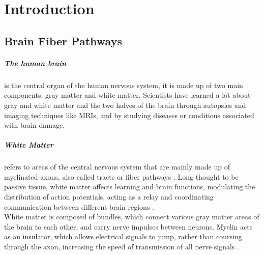 \documentclass[../structure.tex]{subfiles}
\begin{document}
\chapter{Introduction}
	\section{Brain Fiber Pathways}
	\paragraph{The human brain} is the central organ of the human nervous system, it is made up of two main components, gray matter and white matter. Scientists have learned a lot about gray and white matter and the two halves of the brain through autopsies and imaging techniques like MRIs, and by studying diseases or conditions associated with brain damage.
	\paragraph{White Matter}refers to areas of the central nervous system that are mainly made up of myelinated axons, also called tracts or fiber pathways \cite{Blumenfeld2010}. Long thought to be passive tissue, white matter affects learning and brain functions, modulating the distribution of action potentials, acting as a relay and coordinating communication between different brain regions \cite{Fields2008}.\\
White matter is composed of bundles, which connect various gray matter areas %
 of the brain to each other, and carry nerve impulses between neurons. Myelin acts as an insulator, which allows electrical signals to jump, rather than coursing through the axon, increasing the speed of transmission of all nerve signals \cite{Klein2008}.
 
\end{document}
